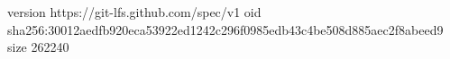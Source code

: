 version https://git-lfs.github.com/spec/v1
oid sha256:30012aedfb920eca53922ed1242c296f0985edb43c4be508d885aec2f8abeed9
size 262240
